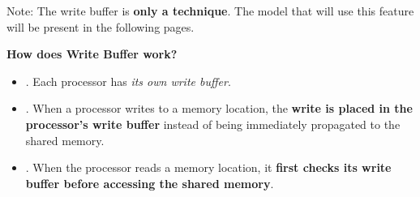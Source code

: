\highspace
Note: The write buffer is \textbf{only a technique}. The model that will use this feature will be present in the following pages.

\begin{flushleft}
    \textcolor{Green3}{ \textbf{How does Write Buffer work?}}
\end{flushleft}
\begin{itemize}
    \item {}. Each processor has \emph{its own write buffer}.
    \item {}. When a processor writes to a memory location, the \textbf{write is placed in the processor's write buffer} instead of being immediately propagated to the shared memory.
    \item {}. When the processor reads a memory location, it \textbf{first checks its write buffer before accessing the shared memory}.
\end{itemize}

